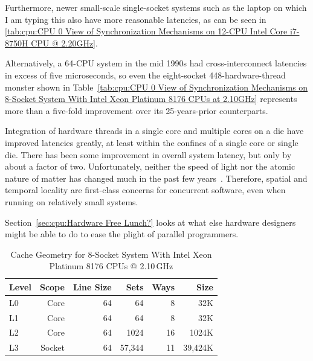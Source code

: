 {	Furthermore, newer small-scale single-socket systems such
	as the laptop on which I am typing this also have more
	reasonable latencies, as can be seen in
	\cref{tab:cpu:CPU 0 View of Synchronization Mechanisms on 12-CPU Intel Core i7-8750H CPU @ 2.20GHz}.

	Alternatively, a 64-CPU system in the mid 1990s had
	cross-interconnect latencies in excess of five microseconds,
	so even the eight-socket 448-hardware-thread monster shown in
	Table~\ref{tab:cpu:CPU 0 View of Synchronization Mechanisms on 8-Socket System With Intel Xeon Platinum 8176 CPUs at 2.10GHz}
	represents more than a five-fold improvement over its
	25-years-prior counterparts.

	Integration of hardware threads in a single core and multiple
	cores on a die have improved latencies greatly, at least within the
	confines of a single core or single die.
	There has been some improvement in overall system latency,
	but only by about a factor of two.
	Unfortunately, neither the speed of light nor the atomic nature
	of matter has changed much in the past few
	years~\cite{NoBugsHare2016CPUoperations}.
	Therefore, spatial and temporal locality are first-class concerns
	for concurrent software, even when running on relatively
	small systems.

	Section~\ref{sec:cpu:Hardware Free Lunch?}
	looks at what else hardware designers might be
	able to do to ease the plight of parallel programmers.
}\QuickQuizEnd

\begin{table}
\renewcommand*{\arraystretch}{1.1}
\centering\small
\begin{tabular}{lrrrrr}
	\toprule
	Level &  Scope & Line Size &   Sets & Ways &    Size \\
	\midrule
	L0    &   Core &        64 &     64 &    8 &     32K \\
	L1    &   Core &        64 &     64 &    8 &     32K \\
	L2    &   Core &        64 &   1024 &   16 &   1024K \\
	L3    & Socket &        64 & 57,344 &   11 & 39,424K \\
	\bottomrule
\end{tabular}
\caption{Cache Geometry for 8-Socket System With Intel Xeon Platinum 8176 CPUs @ 2.10\,GHz}
\label{tab:cpu:Cache Geometry for 8-Socket System With Intel Xeon Platinum 8176 CPUs @ 2.10GHz}
\end{table}

